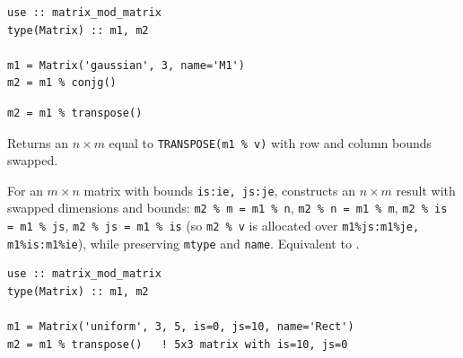 \begin{description}[leftmargin=2.2cm, style=nextline]
\end{description}

\lstset{language=[95]Fortran}
\begin{lstlisting}
use :: matrix_mod_matrix
type(Matrix) :: m1, m2

m1 = Matrix('gaussian', 3, name='M1')
m2 = m1 % conjg()
\end{lstlisting}


\lstset{language=[95]Fortran}
\begin{lstlisting}
m2 = m1 % transpose()
\end{lstlisting}

Returns an $n\times m$  equal to \texttt{TRANSPOSE(m1 \% v)} with row and column bounds swapped.

For an $m \times n$ matrix with bounds \texttt{is:ie, js:je},  constructs an $n \times m$ result  with swapped dimensions and bounds: \texttt{m2 \% m = m1 \% n}, \texttt{m2 \% n = m1 \% m}, \texttt{m2 \% is = m1 \% js}, \texttt{m2 \% js = m1 \% is} (so \texttt{m2 \% v} is allocated over \texttt{m1\%js:m1\%je, m1\%is:m1\%ie}), while preserving \texttt{mtype} and \texttt{name}. Equivalent to .

\begin{description}[leftmargin=2.2cm, style=nextline]
\end{description}

\lstset{language=[95]Fortran}
\begin{lstlisting}
use :: matrix_mod_matrix
type(Matrix) :: m1, m2

m1 = Matrix('uniform', 3, 5, is=0, js=10, name='Rect')
m2 = m1 % transpose()   ! 5x3 matrix with is=10, js=0
\end{lstlisting}

